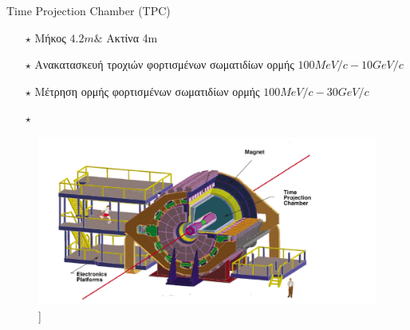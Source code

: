 \documentclass[18pt,notheorems,hyperref={pdfauthor=whatever}]{beamer}
\begin{document}
%
%
%
%
   
\begin{frame}{Time Projection Chamber (TPC)}
     \begin{minipage}{0.4\textwidth}
        \begin{itemize}
            \item[$\star$] Μήκος $4.2m \&$ Ακτίνα 4m 
            \item[$\star$] Ανακατασκευή τροχιών φορτισμένων σωματιδίων ορμής $100MeV/c  -  10GeV/c$
            \item[$\star$] Μέτρηση ορμής φορτισμένων σωματιδίων ορμής $100MeV/c  - 30GeV/c$
            \item[$\star$]
        \end{itemize}
    \end{minipage}
    \begin{minipage}{0.55\textwidth}
        \begin{figure}
            \centering
            \includegraphics[scale=0.5]{images/Star_TPC_Magnets.png}]
        \end{figure}
    \end{minipage}
\end{frame}
\end{document}
